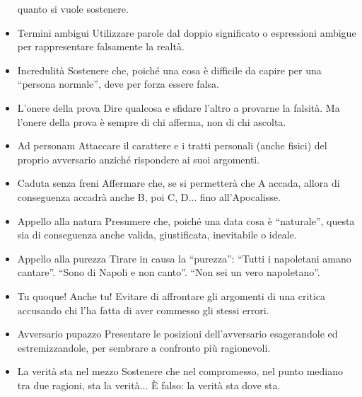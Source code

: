 \documentclass[12pt]{book} %
\begin{document}
\begin{itemize}
quanto si vuole sostenere.
\item Termini ambigui Utilizzare parole dal doppio significato o espressioni ambigue per rappresentare falsamente la
realtà.
\item Incredulità Sostenere che, poiché una cosa è difficile da capire per una “persona normale”, deve per forza essere
falsa.
\item L'onere della prova Dire qualcosa e sfidare l'altro a provarne la
falsità. Ma l'onere della prova è sempre di chi afferma, non di chi ascolta.
\item Ad personam Attaccare il carattere e i tratti personali (anche fisici) del proprio avversario anziché rispondere
ai suoi argomenti.
\item Caduta senza freni Affermare che, se si permetterà che A accada, allora di conseguenza accadrà anche B, poi C,
D... fino all'Apocalisse.
\item Appello alla natura Presumere che, poiché una data cosa è “naturale”, questa sia di conseguenza anche valida,
giustificata, inevitabile o ideale.
\item Appello alla purezza Tirare in causa la “purezza”: “Tutti i napoletani amano cantare”. “Sono di Napoli e non
canto”. “Non sei un vero napoletano”.
\item Tu quoque! Anche tu! Evitare di affrontare gli argomenti di una critica accusando chi l'ha
fatta di aver commesso gli stessi errori.
\item Avversario pupazzo Presentare le posizioni dell'avversario esagerandole ed estremizzandole,
per sembrare a confronto più ragionevoli.
\item La verità sta nel mezzo Sostenere che nel compromesso, nel punto mediano tra due ragioni, sta la verità... È
falso: la verità sta dove sta.
\end{itemize}

\bigskip
\end{document}
